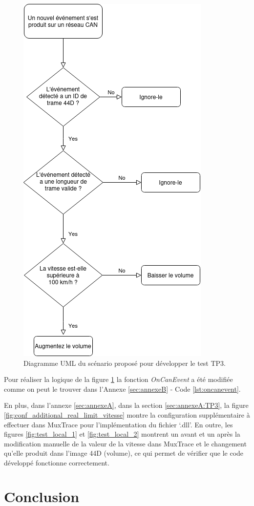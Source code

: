 \documentclass{rapportECC}
\begin{document}
\begin{figure}[H]
    \centering
    \includegraphics[width=.5\textwidth]{./images/OnCanEvent_UML.png}
    \caption{Diagramme UML du scénario proposé pour développer le test TP3.}
    \label{fig:OnCanEvent_UML}
\end{figure}

Pour réaliser la logique de la figure \ref{fig:OnCanEvent_UML} la fonction \textit{OnCanEvent} a été modifiée comme on peut le trouver dans l'Annexe \ref{sec:annexeB} - Code \ref{lst:oncanevent}.

En plus, dans l'annexe \ref{sec:annexeA}, dans la section \ref{sec:annexeA:TP3}, la figure \ref{fig:conf_additional_real_limit_vitesse} montre la configuration supplémentaire à effectuer dans MuxTrace pour l'implémentation du fichier `.dll'. En outre, les figures \ref{fig:test_local_1} et \ref{fig:test_local_2} montrent un avant et un après la modification manuelle de la valeur de la vitesse dans MuxTrace et le changement qu'elle produit dans l'image 44D (volume), ce qui permet de vérifier que le code développé fonctionne correctement.

\section{Conclusion}



 
\end{document}

